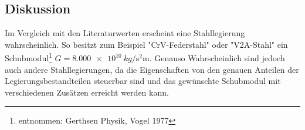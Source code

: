 













\newpage


\subsection{Diskussion}

Im Vergleich mit den Literaturwerten erscheint eine Stahllegierung wahrscheinlich. So besitzt zum Beispiel "CrV-Federstahl" oder "V2A-Stahl" ein Schubmodul\footnote{entnommen: Gerthsen Physik, Vogel 1977} $G=\SI{8.000 e10}{kg \per  \second \squared \metre}$.
Genauso Wahrscheinlich sind jedoch auch andere Stahllegierungen, da die Eigenschaften von den genauen Anteilen der Legierungsbestandteilen steuerbar sind und das gewünschte Schubmodul mit verschiedenen Zusätzen erreicht werden kann.








